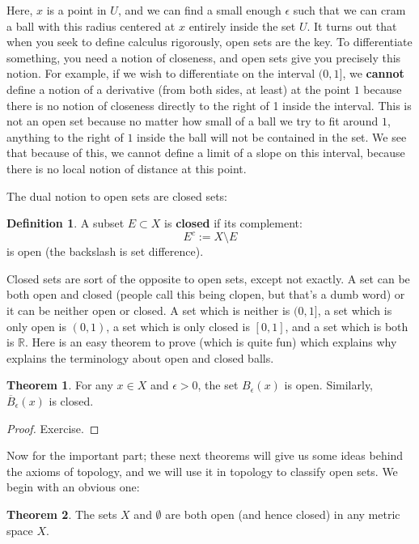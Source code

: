 \documentclass[11pt, oneside]{amsart}   	%
\theoremstyle{definition}
\newtheorem{definition}{Definition}[section]
\newtheorem{theorem}{Theorem}[section]
\begin{document}
	Here, $x$ is a point in $U$, and we can find a small enough $\epsilon$ such that we can cram a ball with this radius centered at $x$ entirely inside the set 
	$U$. It turns out that when you seek to define calculus rigorously, open sets are the key. To differentiate something, you need a notion of closeness, and 
	open sets give you precisely this notion. For example, if we wish to differentiate on the interval $(0, 1]$, we \textbf{cannot} define a notion of a derivative 
	(from both sides, at least) at the point $1$ because there is no notion of closeness directly to the right of 1 inside the interval. This is not an open set 
	because no matter how small of a ball we try to fit around $1$, anything to the right of $1$ inside the ball will not be contained in the set. We see that 
	because of this, we cannot define a limit of a slope on this interval, because there is no local notion of distance at this point.
	
	The dual notion to open sets are closed sets:
	\begin{definition}
		A subset $E\subset X$ is \textbf{closed} if its complement:
		$$
			E^c := X\setminus E
		$$
		is open (the backslash is set difference).
	\end{definition}
	
	Closed sets are sort of the opposite to open sets, except not exactly. A set can be both open and closed (people call this being clopen, but that's a dumb 
	word) or it can be neither open or closed. A set which is neither is $(0, 1]$, a set which is only open is $(0, 1)$, a set which is only closed is $[0, 1]$, 
	and a set which is both is $\mathbb R$. Here is an easy theorem to prove (which is quite fun) which explains why explains the terminology about open 
	and closed balls.
	
	\begin{theorem}
		For any $x\in X$ and $\epsilon > 0$, the set $B_\epsilon(x)$ is open. Similarly, $\overline B_\epsilon(x)$ is closed.
	\end{theorem}
	
	\begin{proof} Exercise. \end{proof}
	
	Now for the important part; these next theorems will give us some ideas behind the axioms of topology, and we will use it in topology to classify open sets. 
	We begin with an obvious one:
	
	\begin{theorem}
		The sets $X$ and $\emptyset$ are both open (and hence closed) in any metric space $X$.
	\end{theorem}
	
\end{document}
